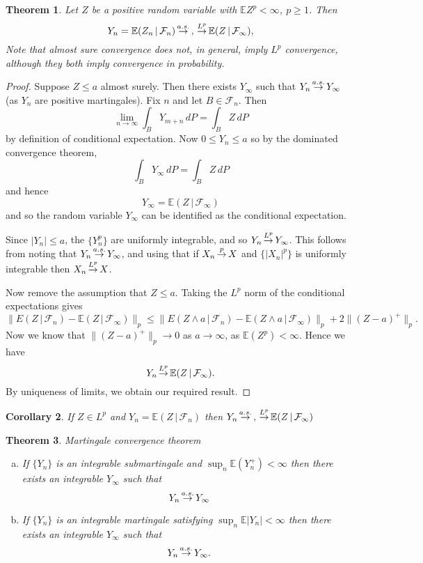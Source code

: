 \documentclass[10pt, oneside, reqno]{amsart}
\theoremstyle{plain}%
\newtheorem{thm}{Theorem}[section]
\newtheorem{cor}[thm]{Corollary}
\theoremstyle{definition}
\theoremstyle{remark}
\newcommand{\given}{ \, | \,}
\newcommand{\sigf}{\mathcal{F}}
\newcommand{\E}{\mathbb{E}}
\def\cip{\,{\buildrel p \over \rightarrow}\,}
\def\cas{\,{\buildrel a.s. \over \rightarrow}\,}
\def\clp{\,{\buildrel L^p \over \rightarrow}\,}
\begin{document}
\begin{thm}
    Let $Z$ be a positive random variable with $\E Z^p < \infty$, $p \geq 1$. Then \[
        Y_n = \E(Z_n \given \sigf_n) \cas, \clp \E(Z \given \sigf_\infty), 
    \]  Note that almost sure convergence does not, in general, imply $L^p$ convergence, although they both imply convergence in probability.  
\end{thm}
\begin{proof}
    Suppose $Z \leq a$ almost surely.  Then there exists $Y_\infty$ such that $Y_n \cas Y_\infty$ (as $Y_n$ are positive martingales).  Fix $n$ and let $B \in \sigf_n$.  Then \[
        \lim_{n \rightarrow \infty} \int_B Y_{m+n} \, dP = \int_B Z \, dP
    \] by definition of conditional expectation.  Now $0 \leq Y_n \leq a$ so by the dominated convergence theorem, \[
        \int_B Y_\infty \, dP = \int_B Z \, dP
    \] and hence \[
        Y_\infty = \E(Z \given \sigf_\infty)
    \] and so the random variable $Y_\infty$ can be identified as the conditional expectation.  
    
    Since $|Y_n| \leq a$, the $\{ Y_n^p \}$ are uniformly integrable, and so $Y_n \clp Y_\infty$.  This follows from noting that $Y_n \cas Y_\infty$, and using that if $X_n \cip X$ and $\{ |X_n|^p \}$ is uniformly integrable then $X_n \clp X$.  
    
    Now remove the assumption that $Z \leq a$. Taking the $L^p$ norm of the conditional expectations gives \[
        \| E(Z \given \sigf_n) - \E(Z \given \sigf_\infty) \|_p \leq \| E(Z \wedge a \given \sigf_n) - \E(Z \wedge a \given \sigf_\infty) \|_p + 2 \| (Z - a)^+ \|_p.
    \]  Now we know that $\|(Z -a)^+\|_p \rightarrow 0$ as $a \rightarrow \infty$, as $\E(Z^p) < \infty$.  Hence we have \[
        Y_n \clp \E(Z \given \sigf_\infty).
    \]  By uniqueness of limits, we obtain our required result.  
\end{proof}
\begin{cor}
    If $Z \in L^p$ and $Y_n = \E(Z \given \sigf_n)$ then $Y_n \cas, \clp \E(Z \given \sigf_\infty)$
\end{cor}

\begin{thm}{Martingale convergence theorem}{\ }
    \begin{enumerate}[(a)]
        \item 
        If $\{ Y_n \}$ is an integrable submartingale and $\sup_{n} \E(Y_n^+) < \infty$ then there exists an integrable $Y_\infty$ such that \[
        Y_n \cas Y_\infty
        \]  
        \item
        If $\{ Y_n \}$ is an integrable martingale satisfying $\sup_n \E |Y_n| < \infty$ then there exists an integrable $Y_\infty$ such that \[
            Y_n \cas Y_\infty.
        \]
    \end{enumerate}
\end{thm}
\end{document}
